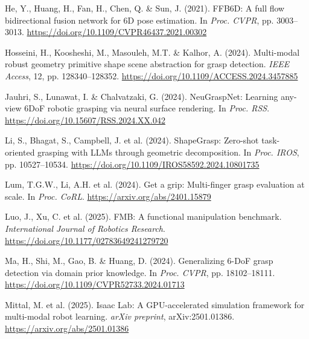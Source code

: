 \documentclass[11pt,a4paper]{article}
\begin{document}
\begin{enumerate}[label={[\arabic*]}, leftmargin=1.2cm, itemsep=3pt]
\item He, Y., Huang, H., Fan, H., Chen, Q. \& Sun, J. (2021). FFB6D: A full flow bidirectional fusion network for 6D pose estimation. In \textit{Proc. CVPR}, pp. 3003--3013. \href{https://doi.org/10.1109/CVPR46437.2021.00302}{https://doi.org/10.1109/CVPR46437.2021.00302}

\item Hosseini, H., Koosheshi, M., Masouleh, M.T. \& Kalhor, A. (2024). Multi-modal robust geometry primitive shape scene abstraction for grasp detection. \textit{IEEE Access}, 12, pp. 128340--128352. \href{https://doi.org/10.1109/ACCESS.2024.3457885}{https://doi.org/10.1109/ACCESS.2024.3457885}

\item Jauhri, S., Lunawat, I. \& Chalvatzaki, G. (2024). NeuGraspNet: Learning any-view 6DoF robotic grasping via neural surface rendering. In \textit{Proc. RSS}. \href{https://doi.org/10.15607/RSS.2024.XX.042}{https://doi.org/10.15607/RSS.2024.XX.042}

\item Li, S., Bhagat, S., Campbell, J. et al. (2024). ShapeGrasp: Zero-shot task-oriented grasping with LLMs through geometric decomposition. In \textit{Proc. IROS}, pp. 10527--10534. \href{https://doi.org/10.1109/IROS58592.2024.10801735}{https://doi.org/10.1109/IROS58592.2024.10801735}

\item Lum, T.G.W., Li, A.H. et al. (2024). Get a grip: Multi-finger grasp evaluation at scale. In \textit{Proc. CoRL}. \href{https://arxiv.org/abs/2401.15879}{https://arxiv.org/abs/2401.15879}

\item Luo, J., Xu, C. et al. (2025). FMB: A functional manipulation benchmark. \textit{International Journal of Robotics Research}. \href{https://doi.org/10.1177/02783649241279720}{https://doi.org/10.1177/02783649241279720}

\item Ma, H., Shi, M., Gao, B. \& Huang, D. (2024). Generalizing 6-DoF grasp detection via domain prior knowledge. In \textit{Proc. CVPR}, pp. 18102--18111. \href{https://doi.org/10.1109/CVPR52733.2024.01713}{https://doi.org/10.1109/CVPR52733.2024.01713}

\item Mittal, M. et al. (2025). Isaac Lab: A GPU-accelerated simulation framework for multi-modal robot learning. \textit{arXiv preprint}, arXiv:2501.01386. \href{https://arxiv.org/abs/2501.01386}{https://arxiv.org/abs/2501.01386}


\end{enumerate}
\end{document}
